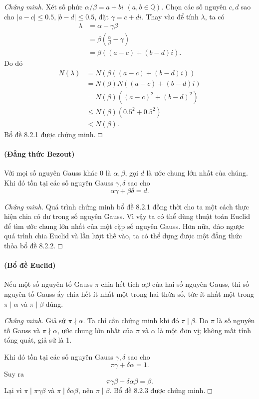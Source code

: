 \documentclass[11pt]{article}
\newcommand{\square}{\mathord{\vcenter{\hrule height .5pt
  \hbox{\vrule width .5pt height 5pt\kern5pt\vrule width .5pt}
  \hrule height .5pt}}}
\begin{document}
\emph{Chứng minh.}
Xét số phức \(\alpha/\beta=a+bi\) \((a,b\in\mathbb Q)\). Chọn các số nguyên
\(c,d\) sao cho \(|a-c|\le0.5, |b-d|\le0.5\), đặt \(\gamma=c+di\). Thay vào để
tính \(\lambda\), ta có
\[
\begin{aligned}
\lambda&=\alpha-\gamma\beta\\
&=\beta\left(\frac{\alpha}{\beta}-\gamma\right)\\
&=\beta((a-c)+(b-d)i).
\end{aligned}
\]
Do đó
\[
\begin{aligned}
N(\lambda)
&=N(\beta((a-c)+(b-d)i))\\
&=N(\beta)N((a-c)+(b-d)i)\\
&=N(\beta)((a-c)^2+(b-d)^2)\\
&\le N(\beta)(0.5^2+0.5^2)\\
&<N(\beta).
\end{aligned}
\]
Bổ đề 8.2.1 được chứng minh. \(\square\)

\paragraph{ (Đẳng thức Bezout)}
Với mọi số nguyên Gauss khác 0 là \(\alpha,\beta\), gọi \(d\) là ước chung lớn
nhất của chúng. Khi đó tồn tại các số nguyên Gauss \(\gamma,\delta\) sao cho
\[
  \alpha\gamma+\beta\delta=d.
\]

\emph{Chứng minh.}
Quá trình chứng minh bổ đề 8.2.1 đồng thời cho ta một cách thực hiện chia có
dư trong số nguyên Gauss. Vì vậy ta có thể dùng thuật toán Euclid để tìm ước
chung lớn nhất của một cặp số nguyên Gauss. Hơn nữa, đảo ngược quá trình chia
Euclid và lần lượt thế vào, ta có thể dựng được một đẳng thức thỏa bổ đề
8.2.2. \(\square\)

\paragraph{ (Bổ đề Euclid)}
Nếu một số nguyên tố Gauss \(\pi\) chia hết tích \(\alpha\beta\) của hai số
nguyên Gauss, thì số nguyên tố Gauss ấy chia hết ít nhất một trong hai thừa
số, tức ít nhất một trong \(\pi\mid\alpha\) và \(\pi\mid\beta\) đúng.

\emph{Chứng minh.}
Giả sử \(\pi\nmid\alpha\). Ta chỉ cần chứng minh khi đó \(\pi\mid\beta\). Do
\(\pi\) là số nguyên tố Gauss và \(\pi\nmid\alpha\), ước chung lớn nhất của
\(\pi\) và \(\alpha\) là một đơn vị; không mất tính tổng quát, giả sử là 1.

Khi đó tồn tại các số nguyên Gauss \(\gamma,\delta\) sao cho
\[
  \pi\gamma+\delta\alpha=1.
\]
Suy ra
\[
  \pi\gamma\beta+\delta\alpha\beta=\beta.
\]
Lại vì \(\pi\mid\pi\gamma\beta\) và \(\pi\mid\delta\alpha\beta\), nên
\(\pi\mid\beta\). Bổ đề 8.2.3 được chứng minh. \(\square\)
\end{document}
